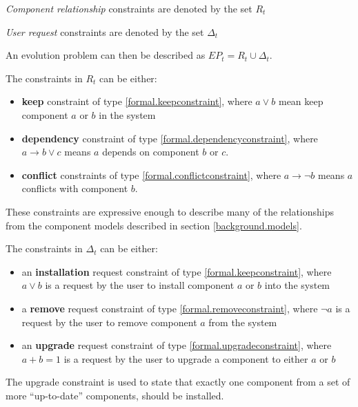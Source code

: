 \begin{defs}
\textit{Component relationship} constraints are denoted by the set $R_t$
\end{defs}

\begin{defs}
\textit{User request} constraints are denoted by the set $\Delta_t$
\end{defs}
An evolution problem can then be described as $EP_t = R_t \cup \Delta_t$.

The constraints in $R_t$ can be either: 
\begin{itemize}
  \item \textbf{keep} constraint of type \ref{formal.keepconstraint}, where $a \vee b$ mean keep component $a$ or $b$ in the system
  \item \textbf{dependency} constraint of type \ref{formal.dependencyconstraint}, where $a \rightarrow b \vee c$ means $a$ depends on component $b$ or $c$.
  \item \textbf{conflict} constraints of type \ref{formal.conflictconstraint},  where $a \rightarrow \neg b$ means $a$ conflicts with component $b$.
\end{itemize}
These constraints are expressive enough to describe many of the relationships from the component models described in section \ref{background.models}.

The constraints in $\Delta_t$ can be either:
\begin{itemize}
  \item an \textbf{installation} request constraint of type \ref{formal.keepconstraint}, where $a \vee b$ is a request by the user to install component $a$ or $b$ into the system
  \item a \textbf{remove} request constraint of type \ref{formal.removeconstraint}, where $\neg a$ is a request by the user to remove component $a$ from the system
  \item an \textbf{upgrade} request constraint of type \ref{formal.upgradeconstraint}, where $a + b = 1$ is a request by the user to upgrade a component to either $a$ or $b$
\end{itemize} 
The upgrade constraint is used to state that exactly one component from a set of more ``up-to-date'' components, should be installed.


